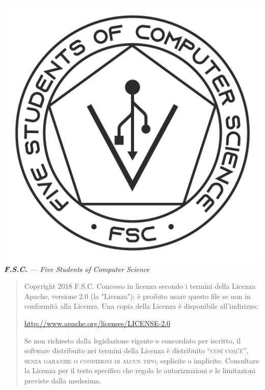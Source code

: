 \begin{titlepage}
		\clearpage
		\vspace*{\fill}
		\includegraphics[height=0.4\textwidth]{Logo_FSC_WhiteBg}\\[0.5cm]
		\textit{\textbf{F.S.C.} --- Five Students of Computer Science}
		
		\vspace*{5cm}
		
		\begin{flushleft}
			\begin{minipage}{\textwidth}%
				\begin{quote}
					\scriptsize Copyright \textcopyright{} 2018 F.S.C.
					\vskip15pt
					Concesso in licenza secondo i termini della Licenza Apache, versione 2.0 (la "Licenza"); è proibito usare questo file se non in conformità alla Licenza. Una copia della Licenza è disponibile all'indirizzo:
					\vskip5pt
					\begin{center}
						\url{http://www.apache.org/licenses/LICENSE-2.0}
					\end{center}
					\vskip5pt
					Se non richiesto dalla legislazione vigente o concordato per iscritto, il software distribuito nei termini della Licenza è distribuito ``\textsc{così com'è}'', \textsc{senza garanzie o condizioni di alcun tipo}, esplicite o implicite. Consultare la Licenza per il testo specifico che regola le autorizzazioni e le limitazioni previste dalla medesima.
				\end{quote}
			\end{minipage}
		\end{flushleft}

		\vspace*{\fill}
		
	\end{titlepage}